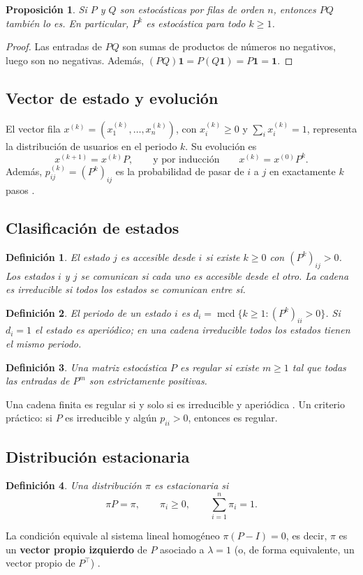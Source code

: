 \documentclass[12pt]{article}
\newtheorem{definicion}{Definición}[section]
\newtheorem{proposicion}{Proposición}[section]
\begin{document}
\begin{proposicion}\label{prop:producto}
    Si $P$ y $Q$ son estocásticas por filas de orden $n$, entonces $PQ$ también lo es. En
    particular, $P^k$ es estocástica para todo $k\ge 1$.
\end{proposicion}
\begin{proof}
    Las entradas de $PQ$ son sumas de productos de números no negativos, luego son no negativas.
    Además, $(PQ)\mathbf{1}=P(Q\mathbf{1})=P\mathbf{1}=\mathbf{1}$.
\end{proof}

\subsection{Vector de estado y evolución}
El vector fila $x^{(k)}=(x^{(k)}_1,\ldots,x^{(k)}_n)$, con $x^{(k)}_i\ge 0$ y
$\sum_i x^{(k)}_i=1$, representa la distribución de usuarios en el periodo $k$. Su evolución es
\[
    x^{(k+1)}=x^{(k)}P,\qquad\text{y por inducción}\qquad x^{(k)}=x^{(0)}P^k.
\]
Además, $p^{(k)}_{ij}=(P^k)_{ij}$ es la probabilidad de pasar de $i$ a $j$ en exactamente $k$
pasos \cite{meyer,strang}.

\subsection{Clasificación de estados}
\begin{definicion}
    El estado $j$ es \emph{accesible} desde $i$ si existe $k\ge 0$ con $(P^k)_{ij}>0$. Los
    estados $i$ y $j$ se \emph{comunican} si cada uno es accesible desde el otro. La cadena es
    \emph{irreducible} si todos los estados se comunican entre sí.
\end{definicion}
\begin{definicion}
    El \emph{periodo} de un estado $i$ es $d_i=\operatorname{mcd}\{k\ge 1: (P^k)_{ii}>0\}$. Si
    $d_i=1$ el estado es \emph{aperiódico}; en una cadena irreducible todos los estados tienen el
    mismo periodo.
\end{definicion}
\begin{definicion}
    Una matriz estocástica $P$ es \emph{regular} si existe $m\ge 1$ tal que todas las entradas de
    $P^m$ son estrictamente positivas.
\end{definicion}
Una cadena finita es regular si y solo si es irreducible y aperiódica \cite{seneta,levin}. Un criterio
práctico: si $P$ es irreducible y algún $p_{ii}>0$, entonces es regular.

\subsection{Distribución estacionaria}
\begin{definicion}
    Una distribución $\pi$ es \emph{estacionaria} si
    \[
        \pi P=\pi,\qquad \pi_i\ge 0,\qquad \sum_{i=1}^n\pi_i=1.
    \]
\end{definicion}
La condición equivale al sistema lineal homogéneo $\pi(P-I)=0$, es decir, $\pi$ es un
\textbf{vector propio izquierdo} de $P$ asociado a $\lambda=1$ (o, de forma equivalente, un vector
propio de $P^{\top}$) \cite{norris,seneta}.
\end{document}

